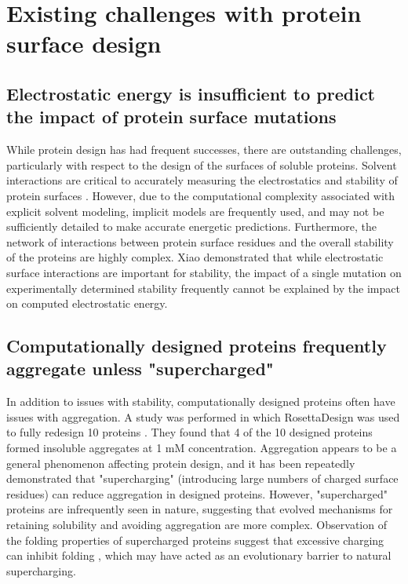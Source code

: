\section{Existing challenges with protein surface design}

\subsection{Electrostatic energy is insufficient to predict the impact of protein surface mutations}
While protein design has had frequent successes, there are outstanding challenges, particularly with respect to the design of the surfaces of soluble proteins.
Solvent interactions are critical to accurately measuring the electrostatics and stability of protein surfaces  \citep{Park:2004kn}.
However, due to the computational complexity associated with explicit solvent modeling, implicit models are frequently used, and may not be sufficiently detailed to make accurate energetic predictions.
Furthermore, the network of interactions between protein surface residues and the overall stability of the proteins are highly complex. 
Xiao  \citep{Xiao:2013dq} demonstrated that while electrostatic surface interactions are important for stability, the impact of a single mutation on experimentally determined stability frequently cannot be explained by the impact on computed electrostatic energy.

\subsection{Computationally designed proteins frequently aggregate unless "supercharged"}
In addition to issues with stability, computationally designed proteins often have issues with aggregation.
A study was performed in which RosettaDesign was used to fully redesign 10 proteins \citep{Dantas:2003vt}.
They found that 4 of the 10 designed proteins formed insoluble aggregates at 1 mM concentration.
Aggregation appears to be a general phenomenon affecting protein design, and it has been repeatedly demonstrated that "supercharging" (introducing large numbers of charged surface residues) \citep{Simeonov:2011jf,Kurnik:2012dz,MichaelSLawrence:2007cv} can reduce aggregation in designed proteins.
However, "supercharged" proteins are infrequently seen in nature, suggesting that evolved mechanisms for retaining solubility and avoiding aggregation are more complex.
Observation of the folding properties of supercharged proteins suggest that excessive charging can inhibit folding \citep{MichaelSLawrence:2007cv}, which may have acted as an evolutionary  barrier to natural supercharging.

